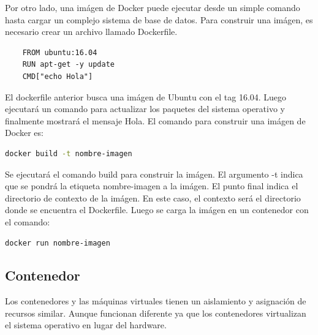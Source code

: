 Por otro lado, una imágen de Docker puede ejecutar desde un simple comando hasta cargar un complejo sistema de base de datos.
Para construir una imágen, es necesario crear un archivo llamado Dockerfile.

\begin{lstlisting}
    FROM ubuntu:16.04
    RUN apt-get -y update
    CMD["echo Hola"]
\end{lstlisting}

El dockerfile anterior busca una imágen de Ubuntu con el tag 16.04. Luego ejecutará un comando para actualizar los paquetes del sistema operativo y finalmente mostrará el mensaje Hola.
El comando para construir una imágen de Docker es:

\begin{lstlisting}[language=bash]
    docker build -t nombre-imagen
\end{lstlisting}

Se ejecutará el comando build para construir la imágen. El argumento -t indica que se pondrá la etiqueta nombre-imagen a la imágen. El punto final indica el directorio de contexto de la imágen. En este caso, el contexto será el directorio donde se encuentra el Dockerfile.
Luego se carga la imágen en un contenedor con el comando:

\begin{lstlisting}[language=bash]
    docker run nombre-imagen
\end{lstlisting}


\subsection[Contenedor]{Contenedor}

Los contenedores y las máquinas virtuales tienen un aislamiento y asignación de recursos similar. Aunque funcionan diferente ya que los contenedores virtualizan el sistema operativo en lugar del hardware.

